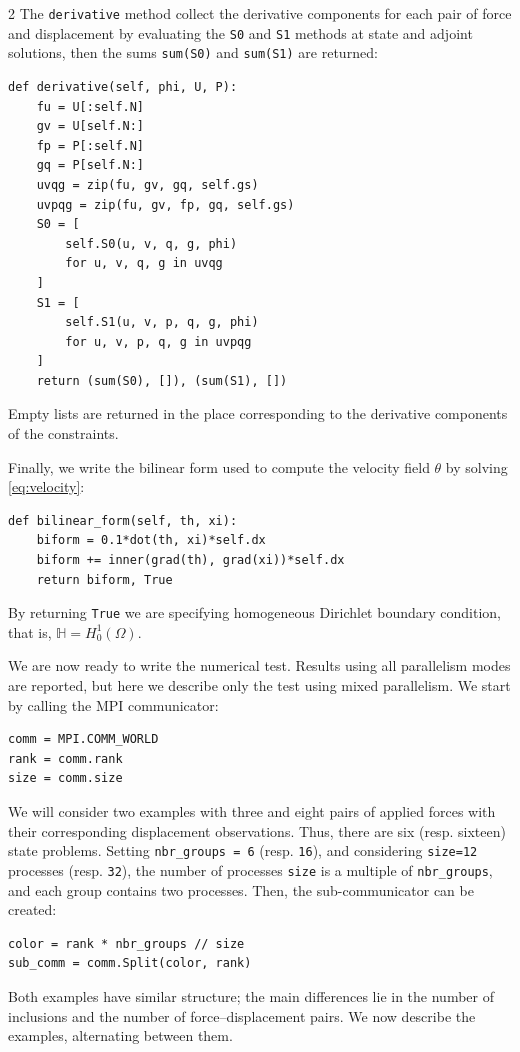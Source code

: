 \documentclass[a4paper, oneside]{article}
\newcommand{\code}[1]{\texttt{#1}}
\begin{document}
\begin{multicols}{2}
The \code{derivative} method collect the derivative components
for each pair of force and displacement
by evaluating the \code{S0} and \code{S1} methods
at state and adjoint solutions,
then the sums \code{sum(S0)} and \code{sum(S1)} are returned: 
\begin{lstlisting}
def derivative(self, phi, U, P):
	fu = U[:self.N]
	gv = U[self.N:]
	fp = P[:self.N]
	gq = P[self.N:]
	uvqg = zip(fu, gv, gq, self.gs)
	uvpqg = zip(fu, gv, fp, gq, self.gs)
	S0 = [
		self.S0(u, v, q, g, phi)
		for u, v, q, g in uvqg
	]
	S1 = [
		self.S1(u, v, p, q, g, phi)
		for u, v, p, q, g in uvpqg
	]
	return (sum(S0), []), (sum(S1), [])
\end{lstlisting}
Empty lists are returned in the place corresponding
to the derivative components of the constraints.

Finally, we write the bilinear form used to compute
the velocity field $\theta$ by solving \eqref{eq:velocity}:
\begin{lstlisting}
def bilinear_form(self, th, xi):
    biform = 0.1*dot(th, xi)*self.dx
	biform += inner(grad(th), grad(xi))*self.dx    
	return biform, True
\end{lstlisting}
By returning \code{True} we are specifying homogeneous Dirichlet boundary condition,
that is, $\mathbb{H}=H^1_0(\Omega)$.

We are now ready to write the numerical test. 
Results using all parallelism modes are reported,
but here we describe only the test using mixed parallelism.
We start by calling the MPI communicator:
\begin{lstlisting}
comm = MPI.COMM_WORLD
rank = comm.rank
size = comm.size
\end{lstlisting}

We will consider two examples with three and eight pairs of
applied forces with their corresponding displacement observations.
Thus, there are six (resp. sixteen) state problems.
Setting \code{nbr\_groups = 6} (resp. \code{16}),
and considering \code{size=12} processes (resp. \code{32}),
the number of processes \code{size} is a multiple of \code{nbr\_groups}, and each group contains two processes.
Then, the sub-communicator can be created:
\begin{lstlisting}
color = rank * nbr_groups // size
sub_comm = comm.Split(color, rank)
\end{lstlisting}

Both examples have similar structure; the main differences lie in
the number of inclusions and the number of force--displacement pairs. 
We now describe the examples, alternating between them.


\end{multicols}
\end{document}
